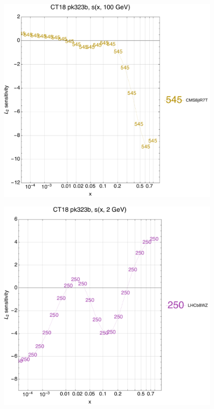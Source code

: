 \documentclass[10pt,aps,prd,floatfix,titlepage]{revtex4}
\begin{document}
\clearpage
\begin{figure}
\includegraphics[width=\textwidth,height=0.44\textheight,keepaspectratio]{1/ifl3_ct18nn_L2_q100_Sf_1.pdf}
\caption{}
\end{figure}
\begin{figure}
\includegraphics[width=\textwidth,height=0.44\textheight,keepaspectratio]{1/ifl3_ct18nn_L2_q2_Sf_1.pdf}
\caption{}
\end{figure}
\end{document}
